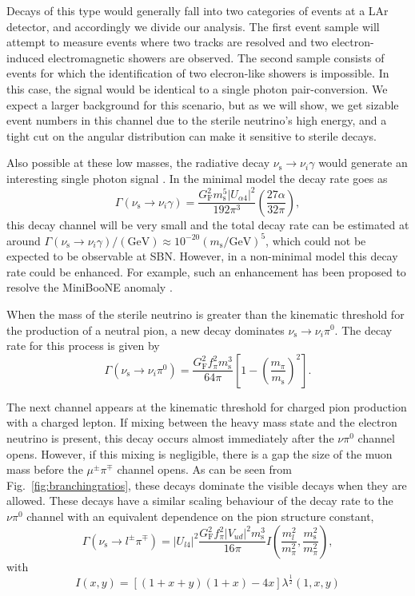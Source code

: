 \documentclass[11pt, a4paper]{article}
\newcommand{\reffig}[1]{Fig.~\ref{#1}}
\begin{document}
%
Decays of this type would generally fall into two categories of events at a LAr
detector, and accordingly we divide our analysis. The first event sample will
attempt to measure events where two tracks are resolved and two
electron-induced electromagnetic showers are observed.
%
The second sample consists of events for which the identification of two
elecron-like showers is impossible. In this case, the signal would be identical
to a single photon pair-conversion. We expect a larger background for this
scenario, but as we will show, we get sizable event numbers in this channel due
to the sterile neutrino's high energy, and a tight cut on the angular
distribution can make it sensitive to sterile decays.

Also possible at these low masses, the radiative decay
$\nu_\text{s}\to\nu_i\gamma$ would generate an interesting single photon
signal \cite{PhysRevD.25.766}. In the minimal model the decay rate goes as
%
\[ \Gamma(\nu_\text{s}\to\nu_i\gamma) = \frac{G_\text{F}^2m_\text{s}^5 |U_{\alpha 4}|^2}{192 \pi^3} \left( \frac{27 \alpha}{32 \pi} \right), \]
%
this decay channel will be very small and the total decay rate can be estimated
at around $\Gamma(\nu_\text{s}\to\nu_i\gamma)/(\text{GeV}) \approx 10^{-20}
(m_\text{s}/\text{GeV})^5$, which could not be expected to be observable at
SBN.  However, in a non-minimal model this decay rate could be enhanced. For
example, such an enhancement has been proposed to resolve the MiniBooNE anomaly
\cite{Gninenko:2009ks,Gninenko:2010pr}.  

When the mass of the sterile neutrino is greater than the kinematic threshold
for the production of a neutral pion, a new decay dominates
$\nu_\text{s}\to\nu_i \pi^0$. The decay rate for this process is given by
%
\[ \Gamma\left(\nu_\text{s} \to \nu_i \pi^0\right) =
\frac{G_\text{F}^2f_\pi^2m_\text{s}^3}{64\pi} \left[1-\left(
\frac{m_\pi}{m_\text{s}} \right)^2\right].  \]

The next channel appears at the kinematic threshold for charged pion production
with a charged lepton. If mixing between the heavy mass state and the electron
neutrino is present, this decay occurs almost immediately after the $\nu\pi^0$
channel opens. However, if this mixing is negligible, there is a gap the size of
the muon mass before the $\mu^\pm\pi^\mp$ channel opens. As can be seen from
\reffig{fig:branchingratios}, these decays dominate the visible decays when
they are allowed. These decays have a similar scaling behaviour of the decay
rate to the $\nu\pi^0$ channel with an equivalent dependence on the pion
structure constant,
%
\[ \Gamma\left(\nu_\text{s} \to l^\pm\pi^\mp\right) =
	\left|U_{l4}\right|^2\frac{G_\text{F}^2f_\pi^2 |V_{ud}|^2  m_\text{s}^3}{16\pi}I\left(\frac{m_l^2}{m_\pi^2} , \frac{m_\text{s}^2}{m_\pi^2}\right) ,
\]
with 
\[
	I(x,y) = \left[ \left( 1+x+y\right) \left(1+x\right) -4 x\right] \lambda^\frac{1}{2}\left(1,x,y\right)
\]
\end{document}
